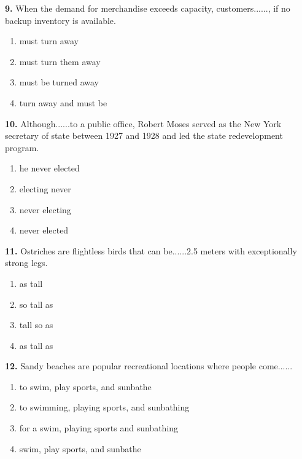 \documentclass[12pt]{article}
\begin{document}
\par
\vspace{0.25\baselineskip}
\noindent\textbf{9.} When the demand for merchandise exceeds capacity, customers......, if no backup inventory is available.
\begin{enumerate}[label=(\Alph*),leftmargin=*,itemsep=0.2em]
\item must turn away
\item must turn them away
\item must be turned away
\item turn away and must be
\end{enumerate}
\par
\vspace{0.25\baselineskip}
\noindent\textbf{10.} Although......to a public office, Robert Moses served as the New York secretary of state between 1927 and 1928 and led the state redevelopment program.
\begin{enumerate}[label=(\Alph*),leftmargin=*,itemsep=0.2em]
\item he never elected
\item electing never
\item never electing
\item never elected
\end{enumerate}
\par
\vspace{0.25\baselineskip}
\noindent\textbf{11.} Ostriches are flightless birds that can be......2.5 meters with exceptionally strong legs.
\begin{enumerate}[label=(\Alph*),leftmargin=*,itemsep=0.2em]
\item as tall
\item so tall as
\item tall so as
\item as tall as
\end{enumerate}
\par
\vspace{0.25\baselineskip}
\noindent\textbf{12.} Sandy beaches are popular recreational locations where people come......
\begin{enumerate}[label=(\Alph*),leftmargin=*,itemsep=0.2em]
\item to swim, play sports, and sunbathe
\item to swimming, playing sports, and sunbathing
\item for a swim, playing sports and sunbathing
\item swim, play sports, and sunbathe
\end{enumerate}
\end{document}
